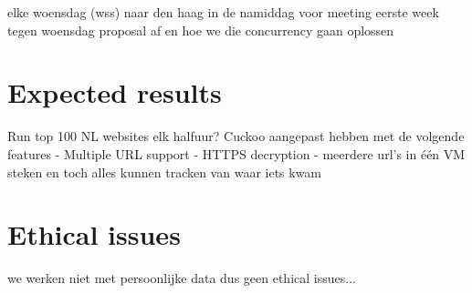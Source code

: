 \documentclass{scrartcl}
\begin{document}
elke woensdag (wss) naar den haag in de namiddag voor meeting
eerste week tegen woensdag proposal af en hoe we die concurrency gaan oplossen
 

\section{Expected results}
	Run top 100 NL websites elk halfuur?
	Cuckoo aangepast hebben met de volgende features
		- Multiple URL support
		- HTTPS decryption
		- meerdere url's in één VM steken en toch alles kunnen tracken van waar iets kwam

\section{Ethical issues}
	we werken niet met persoonlijke data dus geen ethical issues...



\end{document}

